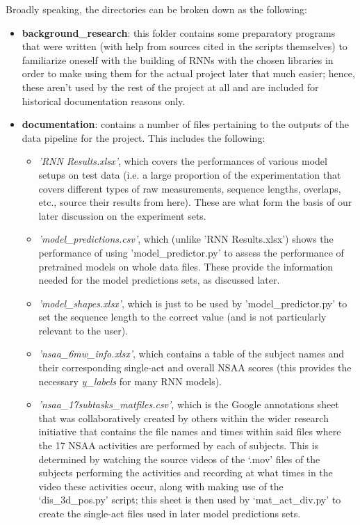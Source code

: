 \documentclass[12pt,twoside]{report}
\begin{document}
Broadly speaking, the directories can be broken down as the following:

\begin{itemize}
	\item \textbf{background\_research}: this folder contains some preparatory programs that were written (with help from sources cited in the scripts themselves) to familiarize oneself with the building of RNNs with the chosen libraries in order to make using them for the actual project later that much easier; hence, these aren't used by the rest of the project at all and are included for historical documentation reasons only.
	\item \textbf{documentation}: contains a number of files pertaining to the outputs of the data pipeline for the project. This includes the following:
	\begin{itemize}
		\item \textit{'RNN Results.xlsx'}, which covers the performances of various model setups on test data (i.e. a large proportion of the experimentation that covers different types of raw measurements, sequence lengths, overlaps, etc., source their results from here). These are what form the basis of our later discussion on the experiment sets.
		\item \textit{'model\_predictions.csv'}, which (unlike 'RNN Results.xlsx') shows the performance of using 'model\_predictor.py' to assess the performance of pretrained models on whole data files. These provide the information needed for the model predictions sets, as discussed later. 
		\item \textit{'model\_shapes.xlsx'}, which is just to be used by 'model\_predictor.py' to set the sequence length to the correct value (and is not particularly relevant to the user).
		\item \textit{'nsaa\_6mw\_info.xlsx'}, which contains a table of the subject names and their corresponding single-act and overall NSAA scores (this provides the necessary \textit{y\_labels} for many RNN models).
		\item \textit{'nsaa\_17subtasks\_matfiles.csv'}, which is the Google annotations sheet that was collaboratively created by others within the wider research initiative that contains the file names and times within said files where the 17 NSAA activities are performed by each of subjects. This is determined by watching the source videos of the ‘.mov’ files of the subjects performing the activities and recording at what times in the video these activities occur, along with making use of the ‘dis\_3d\_pos.py’ script; this sheet is then used by ‘mat\_act\_div.py’ to create the single-act files used in later model predictions sets.\\

\end{itemize}
\end{itemize}
\end{document}
